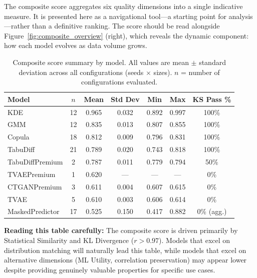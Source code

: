 \documentclass[11pt, a4paper]{report}
\begin{document}
The composite score aggregates six quality dimensions into a single indicative measure. It is presented here as a navigational tool---a starting point for analysis---rather than a definitive ranking. The score should be read alongside Figure~\ref{fig:composite_overview} (right), which reveals the dynamic component: how each model evolves as data volume grows.

\begin{table}[H]
\centering
\caption{Composite score summary by model. All values are mean $\pm$ standard deviation across all configurations (seeds $\times$ sizes). $n$ = number of configurations evaluated.}
\label{tab:composite}
\begin{tabular}{lcccccc}
\toprule
\textbf{Model} & \textbf{$n$} & \textbf{Mean} & \textbf{Std Dev} & \textbf{Min} & \textbf{Max} & \textbf{KS Pass \%} \\
\midrule
\rowcolor{col-kde!15}
KDE              & 12 & 0.965 & 0.032 & 0.892 & 0.997 & 100\% \\
\rowcolor{col-gmm!15}
GMM              & 12 & 0.835 & 0.013 & 0.807 & 0.855 & 100\% \\
\rowcolor{col-cop!15}
Copula           & 18 & 0.812 & 0.009 & 0.796 & 0.831 & 100\% \\
\rowcolor{col-td!15}
TabuDiff         & 21 & 0.789 & 0.020 & 0.743 & 0.818 & 100\% \\
\rowcolor{col-tdp!15}
TabuDiffPremium  &  2 & 0.787 & 0.011 & 0.779 & 0.794 & 50\%  \\
\rowcolor{col-tvaep!15}
TVAEPremium      &  1 & 0.620 & ---   & ---   & ---   & 0\%   \\
\rowcolor{col-ctgan!15}
CTGANPremium     &  3 & 0.611 & 0.004 & 0.607 & 0.615 & 0\%   \\
\rowcolor{col-tvae!15}
TVAE             &  5 & 0.610 & 0.003 & 0.606 & 0.614 & 0\%   \\
\rowcolor{col-mp!15}
MaskedPredictor  & 17 & 0.525 & 0.150 & 0.417 & 0.882 & 0\% (agg.) \\
\bottomrule
\end{tabular}
\end{table}

\begin{insightbox}
\textbf{Reading this table carefully:} The composite score is driven primarily by Statistical Similarity and KL Divergence ($r > 0.97$). Models that excel on distribution matching will naturally lead this table, while models that excel on alternative dimensions (ML Utility, correlation preservation) may appear lower despite providing genuinely valuable properties for specific use cases.
\end{insightbox}
\end{document}
